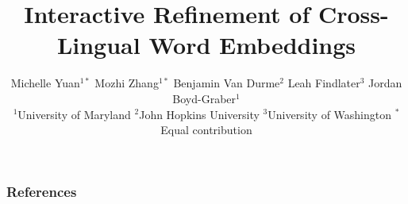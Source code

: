 \documentclass[t]{beamer}
\title{Interactive Refinement of Cross-Lingual Word Embeddings}
\author{
\tiny{
    Michelle Yuan$^{1*}$ Mozhi Zhang$^{1*}$ Benjamin Van Durme$^2$ Leah Findlater$^3$ Jordan Boyd-Graber$^1$
} \\\vspace{10px}
\tiny{$^1$University of Maryland $^2$John Hopkins University
$^3$University of Washington $^*$Equal contribution}
}
\date{}
\newcommand{\latexfile}[1]{}
\begin{document}
\begin{frame}
    \titlepage
\end{frame}

%


\latexfile{10.tex}
\latexfile{20.tex}
\latexfile{30.tex}
\latexfile{40.tex}
%


\begin{frame}[t, allowframebreaks]
\frametitle{References}

\small

\end{frame}
\end{document}
